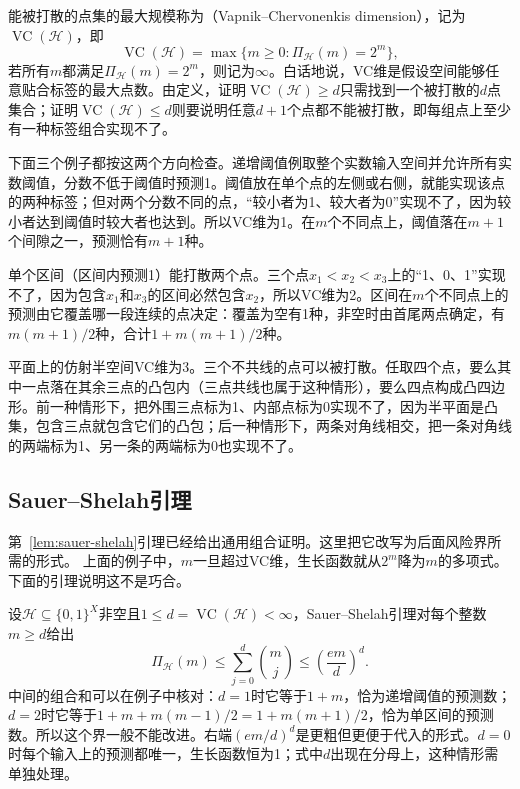 能被打散的点集的最大规模称为（Vapnik--Chervonenkis dimension），记为$\operatorname{VC}(\mathcal H)$，即
\[
 \operatorname{VC}(\mathcal H)=\max\{m\geq0:\Pi_{\mathcal H}(m)=2^m\},
\]
若所有$m$都满足$\Pi_{\mathcal H}(m)=2^m$，则记为$\infty$。白话地说，VC维是假设空间能够任意贴合标签的最大点数。由定义，证明$\operatorname{VC}(\mathcal H)\geq d$只需找到一个被打散的$d$点集合；证明$\operatorname{VC}(\mathcal H)\leq d$则要说明任意$d+1$个点都不能被打散，即每组点上至少有一种标签组合实现不了。

下面三个例子都按这两个方向检查。递增阈值例取整个实数输入空间并允许所有实数阈值，分数不低于阈值时预测1。阈值放在单个点的左侧或右侧，就能实现该点的两种标签；但对两个分数不同的点，“较小者为1、较大者为0”实现不了，因为较小者达到阈值时较大者也达到。所以VC维为1。在$m$个不同点上，阈值落在$m+1$个间隙之一，预测恰有$m+1$种。

单个区间（区间内预测1）能打散两个点。三个点$x_1<x_2<x_3$上的“1、0、1”实现不了，因为包含$x_1$和$x_3$的区间必然包含$x_2$，所以VC维为2。区间在$m$个不同点上的预测由它覆盖哪一段连续的点决定：覆盖为空有1种，非空时由首尾两点确定，有$m(m+1)/2$种，合计$1+m(m+1)/2$种。

平面上的仿射半空间VC维为3。三个不共线的点可以被打散。任取四个点，要么其中一点落在其余三点的凸包内（三点共线也属于这种情形），要么四点构成凸四边形。前一种情形下，把外围三点标为1、内部点标为0实现不了，因为半平面是凸集，包含三点就包含它们的凸包；后一种情形下，两条对角线相交，把一条对角线的两端标为1、另一条的两端标为0也实现不了。

\subsection{Sauer--Shelah引理}
\label{sec:binary-growth-sauer}

第~\ref{lem:sauer-shelah}引理已经给出通用组合证明。这里把它改写为后面风险界所需的形式。
上面的例子中，$m$一旦超过VC维，生长函数就从$2^m$降为$m$的多项式。下面的引理说明这不是巧合。

\label{lem:learning-sauer-shelah}
设$\mathcal H\subseteq\{0,1\}^X$非空且$1\leq d=\operatorname{VC}(\mathcal H)<\infty$，Sauer--Shelah引理对每个整数$m\geq d$给出
\begin{equation}
 \Pi_{\mathcal H}(m)
 \leq\sum_{j=0}^{d}\binom{m}{j}
 \leq\left(\frac{em}{d}\right)^d.
 \label{eq:learning-sauer-shelah}
\end{equation}
中间的组合和可以在例子中核对：$d=1$时它等于$1+m$，恰为递增阈值的预测数；$d=2$时它等于$1+m+m(m-1)/2=1+m(m+1)/2$，恰为单区间的预测数。所以这个界一般不能改进。右端$(em/d)^d$是更粗但更便于代入的形式。$d=0$时每个输入上的预测都唯一，生长函数恒为1；式中$d$出现在分母上，这种情形需单独处理。

